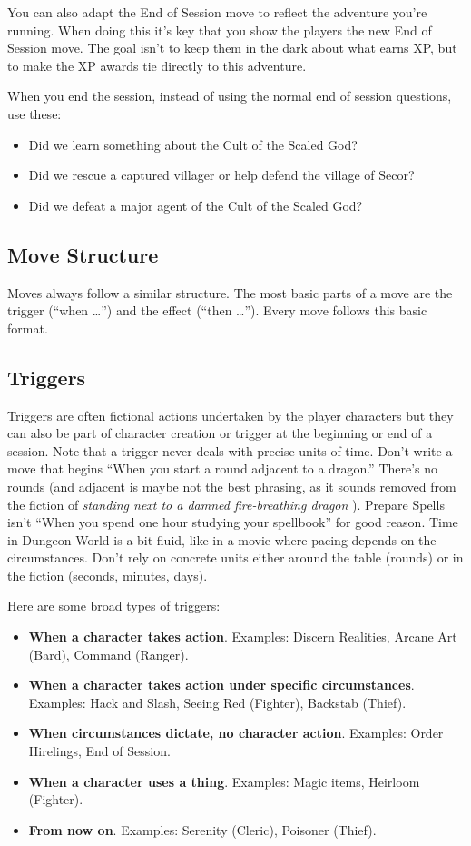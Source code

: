  You can also adapt the End of Session move to reflect the adventure you're running. When doing this it's key that you show the players the new End of Session move. The goal isn't to keep them in the dark about what earns XP, but to make the XP awards tie directly to this adventure.


 When you end the session, instead of using the normal end of session questions, use these:
\begin{itemize}
\item Did we learn something about the Cult of the Scaled God?
\item Did we rescue a captured villager or help defend the village of Secor?
\item Did we defeat a major agent of the Cult of the Scaled God?

\end{itemize}
\subsection{Move Structure}


 Moves always follow a similar structure. The most basic parts of a move are the trigger (``when \ldots '') and the effect (``then \ldots ''). Every move follows this basic format.
\subsection{Triggers}


 Triggers are often fictional actions undertaken by the player characters but they can also be part of character creation or trigger at the beginning or end of a session. Note that a trigger never deals with precise units of time. Don't write a move that begins ``When you start a round adjacent to a dragon.'' There's no rounds (and adjacent is maybe not the best phrasing, as it sounds removed from the fiction of \emph{standing next to a damned fire-breathing dragon}
). Prepare Spells isn't ``When you spend one hour studying your spellbook'' for good reason. Time in Dungeon World is a bit fluid, like in a movie where pacing depends on the circumstances. Don't rely on concrete units either around the table (rounds) or in the fiction (seconds, minutes, days).


 Here are some broad types of triggers:
\begin{itemize}
\item \textbf{When a character takes action}. Examples: Discern Realities, Arcane Art (Bard), Command (Ranger).
\item \textbf{When a character takes action under specific circumstances}. Examples: Hack and Slash, Seeing Red (Fighter), Backstab (Thief).
\item \textbf{When circumstances dictate, no character action}. Examples: Order Hirelings, End of Session.
\item \textbf{When a character uses a thing}. Examples: Magic items, Heirloom (Fighter).
\item \textbf{From now on}. Examples: Serenity (Cleric), Poisoner (Thief).

\end{itemize}
